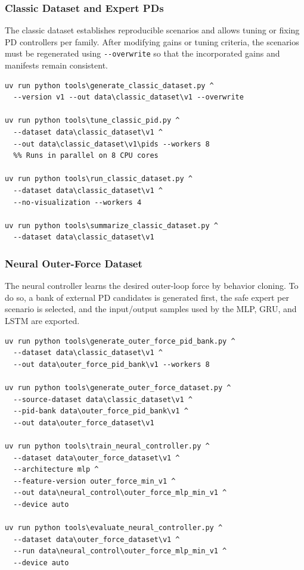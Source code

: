 \subsubsection*{Classic Dataset and Expert PDs}

The classic dataset establishes reproducible scenarios and allows tuning or fixing PD controllers per family. After modifying gains or tuning criteria, the scenarios must be regenerated using \texttt{-}\texttt{-overwrite} so that the incorporated gains and manifests remain consistent.

\begin{verbatim}
uv run python tools\generate_classic_dataset.py ^
  --version v1 --out data\classic_dataset\v1 --overwrite

uv run python tools\tune_classic_pid.py ^
  --dataset data\classic_dataset\v1 ^
  --out data\classic_dataset\v1\pids --workers 8
  %% Runs in parallel on 8 CPU cores

uv run python tools\run_classic_dataset.py ^
  --dataset data\classic_dataset\v1 ^
  --no-visualization --workers 4

uv run python tools\summarize_classic_dataset.py ^
  --dataset data\classic_dataset\v1
\end{verbatim}

\subsubsection*{Neural Outer-Force Dataset}

The neural controller learns the desired outer-loop force by behavior cloning. To do so, a bank of external PD candidates is generated first, the safe expert per scenario is selected, and the input/output samples used by the MLP, GRU, and LSTM are exported.

\begin{verbatim}
uv run python tools\generate_outer_force_pid_bank.py ^
  --dataset data\classic_dataset\v1 ^
  --out data\outer_force_pid_bank\v1 --workers 8

uv run python tools\generate_outer_force_dataset.py ^
  --source-dataset data\classic_dataset\v1 ^
  --pid-bank data\outer_force_pid_bank\v1 ^
  --out data\outer_force_dataset\v1

uv run python tools\train_neural_controller.py ^
  --dataset data\outer_force_dataset\v1 ^
  --architecture mlp ^
  --feature-version outer_force_min_v1 ^
  --out data\neural_control\outer_force_mlp_min_v1 ^
  --device auto

uv run python tools\evaluate_neural_controller.py ^
  --dataset data\outer_force_dataset\v1 ^
  --run data\neural_control\outer_force_mlp_min_v1 ^
  --device auto
\end{verbatim}

